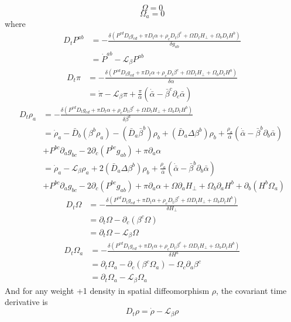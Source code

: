 \documentclass{article}
\begin{document}
\[
\Omega = 0
\]
\[
\Omega_{a} = 0
\]
where
\begin{align*}
D_{t}P^{ab} & = -\frac{\delta \left(P^{cd}D_{t}g_{cd} + \pi D_{t}\alpha + \rho_{c} D_{t}\beta^{c} + \Omega D_{t}H_{\perp} + \Omega_{b}D_{t}H^{b}\right)}{\delta g_{ab}}\\
&  = {\dot P}^{ab} - \mathscr{L}_{\beta}P^{ab}
\end{align*}
\begin{align*}
D_{t}\pi & = -\frac{\delta \left(P^{cd} D_{t}g_{cd} + \pi D_{t}\alpha + \rho_{c} D_{t}\beta^{c}+ \Omega D_{t}H_{\perp} + \Omega_{b}D_{t}H^{b} \right)}{\delta \alpha}\\
&  = {\dot \pi} - \mathscr{L}_{\beta}\pi + \frac{\pi}{{\bar \alpha}}\left({\dot {\bar \alpha}} - {\bar \beta}^{c}\partial_{c}{\bar \alpha}\right)
\end{align*}
\begin{align*}
D_{t}\rho_{a} & = -\frac{\delta \left(P^{cd} D_{t}g_{cd} + \pi D_{t}\alpha + \rho_{c} D_{t}\beta^{c} + \Omega D_{t}H_{\perp} + \Omega_{b}D_{t}H^{b}\right)}{\delta \beta^{a}}\\
& = {\dot \rho}_{a} - {\bar D}_{b}\left(\beta^{b}\rho_{a}\right) - \left({\bar D}_{a}{\bar \beta}^{b}\right)\rho_{b}  + \left({\bar D}_{a}\Delta \beta^{b}\right)\rho_{b} + \frac{\rho_{a}}{{\bar \alpha}}\left({\dot {\bar \alpha}} - {\bar \beta}^{b}\partial_{b}{\bar \alpha}\right)\\
& + P^{bc}\partial_{a}g_{bc} - 2\partial_{c}\left(P^{bc}g_{ab}\right) + \pi \partial_{a}\alpha\\
& = {\dot \rho}_{a} - \mathscr{L}_{\beta}\rho_{a}  + 2\left({\bar D}_{a}\Delta \beta^{b}\right)\rho_{b} + \frac{\rho_{a}}{{\bar \alpha}}\left({\dot {\bar \alpha}} - {\bar \beta}^{b}\partial_{b}{\bar \alpha}\right)\\
& + P^{bc}\partial_{a}g_{bc} - 2\partial_{c}\left(P^{bc}g_{ab}\right) + \pi \partial_{a}\alpha + \Omega\partial_{a}H_{\perp} + \Omega_{b}\partial_{a}H^{b} + \partial_{b}\left(H^{b}\Omega_{a}\right)
\end{align*}
\begin{align*}
D_{t}\Omega &= -\frac{\delta \left(P^{cd} D_{t}g_{cd} + \pi D_{t}\alpha + \rho_{c} D_{t}\beta^{c} + \Omega D_{t}H_{\perp} + \Omega_{b}D_{t}H^{b}\right)}{\delta H_{\perp}}\\
& = \partial_{t}\Omega - \partial_{c}\left(\beta^{c}\Omega\right)\\
& = \partial_{t}\Omega - \mathscr{L}_{\beta}\Omega
\end{align*}
\begin{align*}
D_{t}\Omega_{a} & = -\frac{\delta \left(P^{cd} D_{t}g_{cd} + \pi D_{t}\alpha + \rho_{c} D_{t}\beta^{c} + \Omega D_{t}H_{\perp} + \Omega_{b}D_{t}H^{b}\right)}{\delta H^{a}}\\
& = \partial_{t}\Omega_{a} - \partial_{c}\left(\beta^{c}\Omega_{a}\right) - \Omega_{c}\partial_{a}\beta^{c}\\
& = \partial_{t}\Omega_{a} - \mathscr{L}_{\beta}\Omega_{a}
\end{align*}
And for any weight +1 density in spatial diffeomorphism $\rho$, the covariant time derivative is
\[
D_{t}\rho = {\dot \rho} - \mathscr{L}_{\beta}\rho
\]
\end{document}
